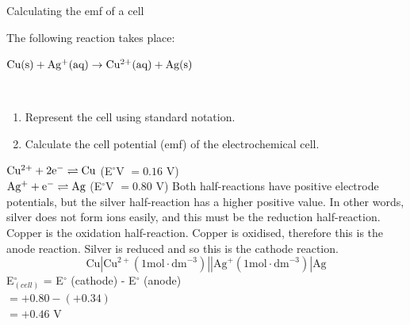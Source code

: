 \begin{wex}{Calculating the emf of a cell}{The following reaction takes place:
\begin{center}
$\rm{Cu(s) + Ag^{+}(aq) \rightarrow Cu^{2+}(aq) + Ag(s)}$
\end{center}\\
\begin{minipage}{\textwidth}
\begin{enumerate}
\item{Represent the cell using standard notation.}
\item{Calculate the cell potential (emf) of the electrochemical cell.\\}
\end{enumerate}
\end{minipage}
}{
$\rm{Cu^{2+} + 2e^{-} \rightleftharpoons Cu}$ (E$^{\circ}$V $= 0.16$ V)\\
$\rm{Ag^{+} + e^{-} \rightleftharpoons Ag}$ (E$^{\circ}$V $= 0.80$ V)
Both half-reactions have positive electrode potentials, but the silver half-reaction has a higher positive value. In other words, silver does not form ions easily, and this must be the reduction half-reaction. Copper is the oxidation half-reaction. Copper is oxidised, therefore this is the anode reaction. Silver is reduced and so this is the cathode reaction.
\begin{equation*}
\text{Cu}|\text{Cu}^{2+} (1 \text{mol} \cdot \text{dm}^{-3})||\text{Ag}^{+} (1 \text{mol} \cdot \text{dm}^{-3})|\text{Ag}
\end{equation*}
E$^{\circ}_{(cell)}$ = E$^{\circ}$ (cathode) - E$^{\circ}$ (anode)\\
$= +0.80 - (+0.34)$\\
$= +0.46$ V
}
\end{wex}

